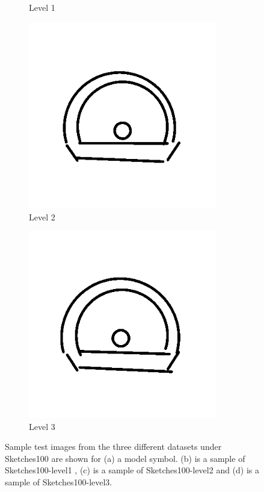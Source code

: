 \begin{figure}[h]
\begin{subfigure}[b]{0.25\textwidth}
                \caption{Level 1}
        \end{subfigure}
                \begin{subfigure}[b]{0.25\textwidth}
                \centering
                \includegraphics[width=0.9\textwidth]{figures/Results/Sketches100/level2.png}
                \caption{Level 2}
        \end{subfigure}
                \begin{subfigure}[b]{0.25\textwidth}
                \centering
                \includegraphics[width=0.9\textwidth]{figures/Results/Sketches100/level3.png}
                \caption{Level 3}
        \end{subfigure}
        \caption[Sample data from 'Sketches100' dataset]{Sample test images from the three different datasets under Sketches100 are shown for (a) a model symbol. (b) is a sample of Sketches100-level1 , (c)  is a sample of Sketches100-level2 and (d) is a sample of Sketches100-level3.}
        \label{fig:Sketches100Examples}
\end{figure}

